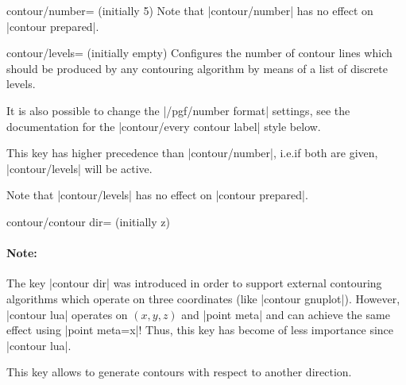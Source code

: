 {{\begin{pgfplotskey}{contour/number= (initially 5)}
    Note that |contour/number| has no effect on |contour prepared|.
\end{pgfplotskey}

\begin{pgfplotskey}{contour/levels= (initially empty)}
    Configures the number of contour lines which should be produced by any
    contouring algorithm by means of a list of discrete levels.
\pgfplotsexpensiveexample
\begin{codeexample}[]
\end{codeexample}
    It is also possible to change the |/pgf/number format| settings, see the
    documentation for the |contour/every contour label| style below.

    This key has higher precedence than |contour/number|, i.e.\@ if both are
    given, |contour/levels| will be active.

    Note that |contour/levels| has no effect on |contour prepared|.
\end{pgfplotskey}

\begin{pgfplotskey}{contour/contour dir= (initially z)}
	\paragraph{Note:} The key |contour dir| was introduced in order to support external contouring algorithms which operate on three coordinates (like |contour gnuplot|). However, |contour lua| operates on $(x,y,z)$ and |point meta| and can achieve the same effect using |point meta=x|! Thus, this key has become of less importance since |contour lua|.

    This key allows to generate contours with respect to another direction.
\pgfplotsexpensiveexample
\begin{codeexample}[]
\end{codeexample}



\end{pgfplotskey}}}
